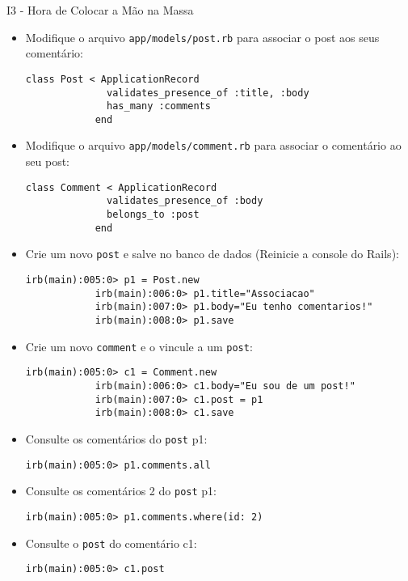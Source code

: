 \begin{frame}{I3 - Hora de Colocar a Mão na Massa}
	\begin{itemize}
		\item Modifique o arquivo \verb|app/models/post.rb| para associar 
		o post aos seus comentário:
		\begin{lstlisting}[style=RubyInputStyle]
			class Post < ApplicationRecord
			  validates_presence_of :title, :body
			  has_many :comments
			end
		\end{lstlisting}
		
		\item Modifique o arquivo \verb|app/models/comment.rb| para associar 
		o comentário ao seu post:
		\begin{lstlisting}[style=RubyInputStyle]
			class Comment < ApplicationRecord
			  validates_presence_of :body
			  belongs_to :post
			end
		\end{lstlisting}
		
		\item Crie um novo \verb|post| e salve no banco de dados (\alert{Reinicie a console do Rails}):
		\begin{lstlisting}[style=BashInputBasicStyle]
			irb(main):005:0> p1 = Post.new
			irb(main):006:0> p1.title="Associacao"
			irb(main):007:0> p1.body="Eu tenho comentarios!"
			irb(main):008:0> p1.save
		\end{lstlisting}
		
		\item Crie um novo \verb|comment| e o vincule a um \verb|post|:
		\begin{lstlisting}[style=BashInputBasicStyle]
			irb(main):005:0> c1 = Comment.new
			irb(main):006:0> c1.body="Eu sou de um post!"
			irb(main):007:0> c1.post = p1
			irb(main):008:0> c1.save
		\end{lstlisting}
		
		\item Consulte os comentários do \verb|post| p1:
		\begin{lstlisting}[style=BashInputBasicStyle]
			irb(main):005:0> p1.comments.all
		\end{lstlisting}
		
		\item Consulte os comentários 2 do \verb|post| p1:
		\begin{lstlisting}[style=BashInputBasicStyle]
			irb(main):005:0> p1.comments.where(id: 2)
		\end{lstlisting}
		
		\item Consulte o \verb|post| do comentário c1:
		\begin{lstlisting}[style=BashInputBasicStyle]
			irb(main):005:0> c1.post
		\end{lstlisting}
					
	\end{itemize}
\end{frame}